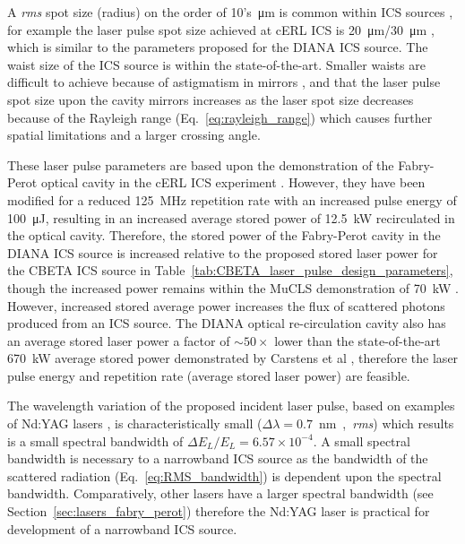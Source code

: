 \documentclass[../main.tex]{subfiles}
\begin{document}
A \textit{rms} spot size (radius) on the order of 10's~\si{\micro\meter} is common within ICS sources \cite{deitrick2017inverse,drebot2019brixs,dupraz2020thomx}, for example the laser pulse spot size achieved at cERL ICS is 20~\si{\micro\meter}/30~\si{\micro\meter} \cite{akagi2016narrow}, which is similar to the parameters proposed for the DIANA ICS source. The waist size of the ICS source is within the state-of-the-art. Smaller waists are difficult to achieve because of astigmatism in mirrors \cite{zomer2009polarization}, and that the laser pulse spot size upon the cavity mirrors increases as the laser spot size decreases because of the Rayleigh range (Eq.~\ref{eq:rayleigh_range}) which causes further spatial limitations and a larger crossing angle.

These laser pulse parameters are based upon the demonstration of the Fabry-Perot optical cavity in the cERL ICS experiment \cite{akagi2016narrow}. However, they have been modified for a reduced 125~\si{\mega\hertz} repetition rate with an increased pulse energy of 100~\si{\micro\joule}, resulting in an increased average stored power of 12.5~\si{\kilo\watt} recirculated in the optical cavity. Therefore, the stored power of the Fabry-Perot cavity in the DIANA ICS source is increased relative to the proposed  stored laser power for the CBETA ICS source in Table~\ref{tab:CBETA_laser_pulse_design_parameters}, though the increased power remains within the MuCLS demonstration of 70~\si{\kilo\watt} \cite{eggl2016munich}. However, increased stored average power increases the flux of scattered photons produced from an ICS source. The DIANA optical re-circulation cavity also has an average stored laser power a factor of $\sim50\times$ lower than the state-of-the-art 670~\si{\kilo\watt} average stored power demonstrated by Carstens et al \cite{carstens2014megawatt}, therefore the laser pulse energy and repetition rate (average stored laser power) are feasible. 

The wavelength variation of the proposed incident laser pulse, based on examples of Nd:YAG lasers \cite{thorlabs2021ndyag200}, is characteristically small ($\Delta\lambda = 0.7$~\si{\nano\meter, \textit{rms}}) \cite{corner2019} which results is a small spectral bandwidth of $\Delta E_{L}/E_{L} = 6.57\times 10^{-4}$. A small spectral bandwidth is necessary to a narrowband ICS source as the bandwidth of the scattered radiation (Eq.~\ref{eq:RMS_bandwidth}) is dependent upon the spectral bandwidth. Comparatively, other lasers have a larger spectral bandwidth (see Section~\ref{sec:lasers_fabry_perot}) therefore the Nd:YAG laser is practical for development of a narrowband ICS source. 
\end{document}
